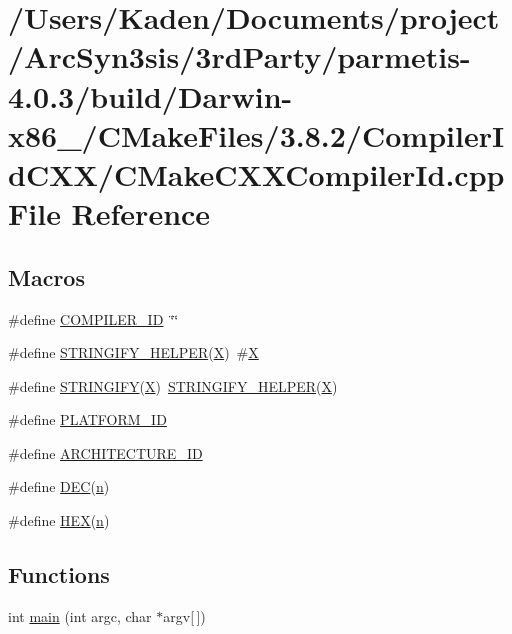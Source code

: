 \hypertarget{a00786}{}\section{/\+Users/\+Kaden/\+Documents/project/\+Arc\+Syn3sis/3rd\+Party/parmetis-\/4.0.3/build/\+Darwin-\/x86\+\_/\+C\+Make\+Files/3.8.2/\+Compiler\+Id\+C\+X\+X/\+C\+Make\+C\+X\+X\+Compiler\+Id.cpp File Reference}
\label{a00786}
\subsection*{Macros}
\begin{DoxyCompactItemize}
\item 
\#define \hyperlink{a00786_a81dee0709ded976b2e0319239f72d174}{C\+O\+M\+P\+I\+L\+E\+R\+\_\+\+ID}~\char`\"{}\char`\"{}
\item 
\#define \hyperlink{a00786_a2ae9b72bb13abaabfcf2ee0ba7d3fa1d}{S\+T\+R\+I\+N\+G\+I\+F\+Y\+\_\+\+H\+E\+L\+P\+ER}(\hyperlink{a00611_a708712aede48a739e9ae0c42413ef460}{X})~\#\hyperlink{a00611_a708712aede48a739e9ae0c42413ef460}{X}
\item 
\#define \hyperlink{a00786_a43e1cad902b6477bec893cb6430bd6c8}{S\+T\+R\+I\+N\+G\+I\+FY}(\hyperlink{a00611_a708712aede48a739e9ae0c42413ef460}{X})~\hyperlink{a00801_a2ae9b72bb13abaabfcf2ee0ba7d3fa1d}{S\+T\+R\+I\+N\+G\+I\+F\+Y\+\_\+\+H\+E\+L\+P\+ER}(\hyperlink{a00611_a708712aede48a739e9ae0c42413ef460}{X})
\item 
\#define \hyperlink{a00786_adbc5372f40838899018fadbc89bd588b}{P\+L\+A\+T\+F\+O\+R\+M\+\_\+\+ID}
\item 
\#define \hyperlink{a00786_aba35d0d200deaeb06aee95ca297acb28}{A\+R\+C\+H\+I\+T\+E\+C\+T\+U\+R\+E\+\_\+\+ID}
\item 
\#define \hyperlink{a00786_ad1280362da42492bbc11aa78cbf776ad}{D\+EC}(\hyperlink{a00623_a781a04ab095280f838ff3eb0e51312e0}{n})
\item 
\#define \hyperlink{a00786_a46d5d95daa1bef867bd0179594310ed5}{H\+EX}(\hyperlink{a00623_a781a04ab095280f838ff3eb0e51312e0}{n})
\end{DoxyCompactItemize}
\subsection*{Functions}
\begin{DoxyCompactItemize}
\item 
int \hyperlink{a00786_a0ddf1224851353fc92bfbff6f499fa97}{main} (int argc, char $\ast$argv\mbox{[}$\,$\mbox{]})
\end{DoxyCompactItemize}

